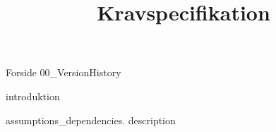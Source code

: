 \documentclass[a4paper,openany]{memoir}
\title{Kravspecifikation}
\begin{document}
	{Forside}  \newpage
	\tableofcontents\thispagestyle{fancy}
	{00_VersionHistory}  \newpage

	{introduktion} \newpage

	{assumptions_dependencies.}
	{description}  \newpage

	 {}
	\printbibliography
\end{document}
